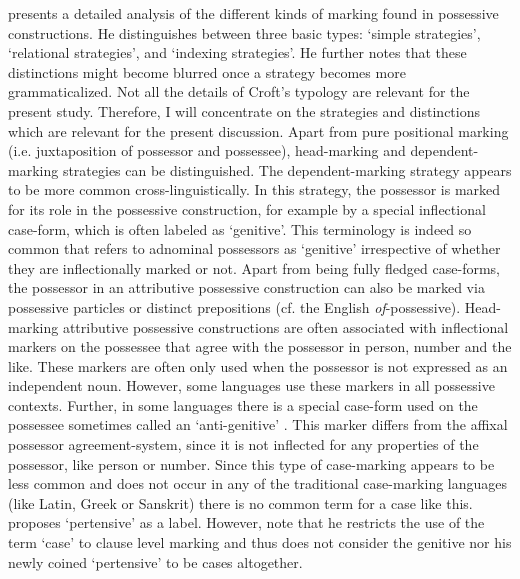 \citet[32--40]{Croft:2003} presents a detailed analysis of the different kinds of marking found in possessive constructions.
He distinguishes between three basic types: `simple strategies', `relational strategies', and `indexing strategies'. 
He further notes that these distinctions might become blurred once a strategy becomes more grammaticalized. 
Not all the details of Croft's typology are relevant for the present study. 
Therefore, I will concentrate on the strategies and distinctions which are relevant for the present discussion.
Apart from pure positional marking (i.e. juxtaposition of possessor and possessee), head-marking and dependent-marking strategies can be distinguished. 
The dependent-marking strategy appears to be more common cross-linguistically. 
In this strategy, the possessor is marked for its role in the possessive construction, for example by a special inflectional case-form, which is often labeled as `genitive'. 
This terminology is indeed so common that \citet[104]{Payne:1997} refers to adnominal possessors as `genitive' irrespective of whether they are inflectionally marked or not. 
Apart from being fully fledged case-forms, the possessor in an attributive possessive construction can also be marked via possessive particles or distinct prepositions (cf. the English \textit{of}-possessive). 
Head-marking attributive possessive constructions are often associated with inflectional markers on the possessee that agree with the possessor in person, number and the like. 
These markers are often only used when the possessor is not expressed as an independent noun. 
However, some languages use these markers in all possessive contexts.
Further, in some languages there is a special case-form used on the possessee sometimes called an `anti-genitive' \citep{Andersen:1991}. 
This marker differs from the affixal possessor agreement-system, since it is not inflected for any properties of the possessor, like person or number. 
Since this type of case-marking appears to be less common and does not occur in any of the traditional case-marking languages (like Latin, Greek or Sanskrit)  there is no common term for a case like this.
\citet[268]{Dixon:2010-2} proposes `pertensive' as a label. 
However, note that he restricts the use of the term `case' to clause level marking
and thus does not consider the genitive nor his newly coined `pertensive' to be cases altogether.

